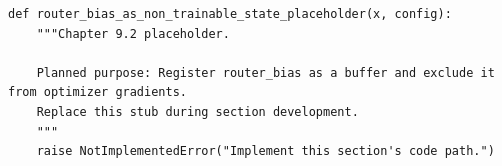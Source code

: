 \begin{lstlisting}[style=bookpython,caption={Planned code placeholder for router bias as non trainable state.},label={lst:ch09-router-bias-as-non-trainable-state}]
def router_bias_as_non_trainable_state_placeholder(x, config):
    """Chapter 9.2 placeholder.

    Planned purpose: Register router_bias as a buffer and exclude it from optimizer gradients.
    Replace this stub during section development.
    """
    raise NotImplementedError("Implement this section's code path.")
\end{lstlisting}
